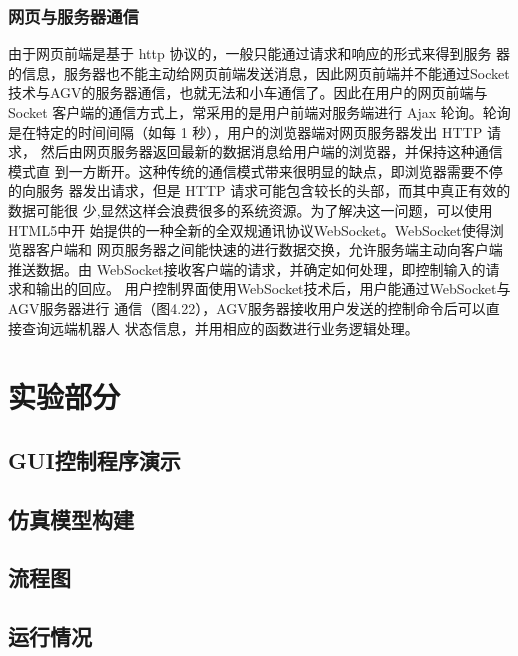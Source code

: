 \documentclass[cs4size,a4paper]{ctexart}
\numberwithin{equation}{section}
\numberwithin{table}{section}
\numberwithin{figure}{section}
\begin{document}
\subsubsection{网页与服务器通信}
由于网页前端是基于 http 协议的，一般只能通过请求和响应的形式来得到服务 器的信息，服务器也不能主动给网页前端发送消息，因此网页前端并不能通过Socket 技术与AGV的服务器通信，也就无法和小车通信了。因此在用户的网页前端与 Socket 客户端的通信方式上，常采用的是用户前端对服务端进行 Ajax 轮询。轮询 是在特定的时间间隔（如每 1 秒），用户的浏览器端对网页服务器发出 HTTP 请求， 然后由网页服务器返回最新的数据消息给用户端的浏览器，并保持这种通信模式直 到一方断开。这种传统的通信模式带来很明显的缺点，即浏览器需要不停的向服务 器发出请求，但是 HTTP 请求可能包含较长的头部，而其中真正有效的数据可能很 少,显然这样会浪费很多的系统资源。为了解决这一问题，可以使用HTML5中开 始提供的一种全新的全双规通讯协议WebSocket。WebSocket使得浏览器客户端和 网页服务器之间能快速的进行数据交换，允许服务端主动向客户端推送数据。由 WebSocket接收客户端的请求，并确定如何处理，即控制输入的请求和输出的回应。 用户控制界面使用WebSocket技术后，用户能通过WebSocket与AGV服务器进行 通信（图4.22），AGV服务器接收用户发送的控制命令后可以直接查询远端机器人 状态信息，并用相应的函数进行业务逻辑处理。
\section{实验部分}

\subsection{GUI控制程序演示}

\subsection{仿真模型构建}

\subsection{流程图}

\subsection{运行情况}

\end{document}

